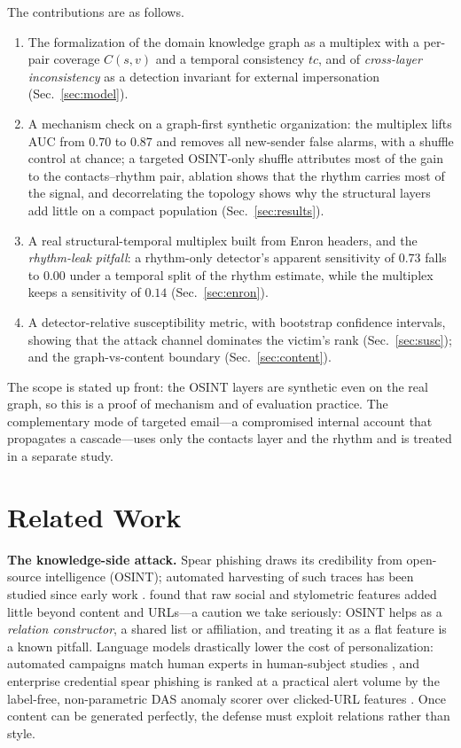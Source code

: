 \documentclass[conference]{IEEEtran}
\begin{document}
The contributions are as follows.
\begin{enumerate}
  \item The formalization of the domain knowledge graph as a multiplex with a per-pair coverage $C(s,v)$ and
  a temporal consistency $tc$, and of \emph{cross-layer inconsistency} as a detection invariant for external
  impersonation (Sec.~\ref{sec:model}).
  \item A mechanism check on a graph-first synthetic organization: the multiplex lifts AUC from $0.70$ to
  $0.87$ and removes all new-sender false alarms, with a shuffle control at chance; a targeted OSINT-only
  shuffle attributes most of the gain to the contacts--rhythm pair, ablation shows that the
  rhythm carries most of the signal, and decorrelating the topology shows why the structural layers add
  little on a compact population (Sec.~\ref{sec:results}).
  \item A real structural-temporal multiplex built from Enron headers, and the \emph{rhythm-leak pitfall}: a
  rhythm-only detector's apparent sensitivity of $0.73$ falls to $0.00$ under a temporal split of the rhythm
  estimate, while the multiplex keeps a sensitivity of $0.14$ (Sec.~\ref{sec:enron}).
  \item A detector-relative susceptibility metric, with bootstrap confidence intervals, showing that the attack
  channel dominates the victim's rank (Sec.~\ref{sec:susc}); and the graph-vs-content boundary
  (Sec.~\ref{sec:content}).
\end{enumerate}
The scope is stated up front: the OSINT layers are synthetic even on the real graph, so this is a proof of
mechanism and of evaluation practice. The complementary mode of targeted email---a compromised internal
account that propagates a cascade---uses only the contacts layer and the rhythm and is treated in a separate
study.

\section{Related Work}
\label{sec:related}
\textbf{The knowledge-side attack.} Spear phishing draws its credibility from open-source intelligence
(OSINT); automated harvesting of such traces has been studied since early work \cite{edwards2017panning}.
\cite{dewan2014analyzing} found that raw social and stylometric features added little beyond content
and URLs---a caution we take seriously: OSINT helps as a \emph{relation constructor}, a shared list or
affiliation, and treating it as a flat feature is a known pitfall. Language models drastically lower the cost
of personalization: automated campaigns match human experts in human-subject studies \cite{bethany2024evaluating},
and enterprise credential spear phishing is ranked at a practical alert volume by the label-free,
non-parametric DAS anomaly scorer over clicked-URL features \cite{ho2017detecting}. Once content can be generated
perfectly, the defense must exploit relations rather than style.
\end{document}
